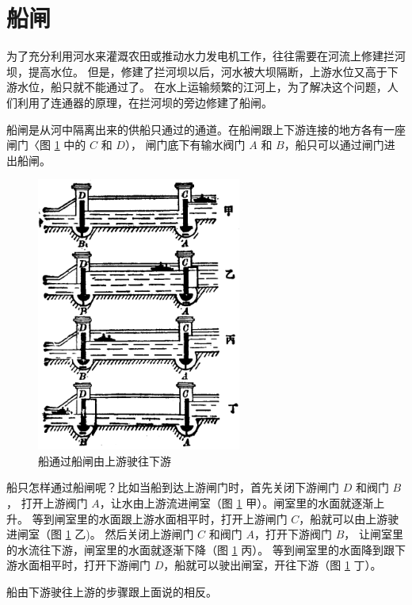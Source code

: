 \section{船闸}\label{sec:5-9}

为了充分利用河水来灌溉农田或推动水力发电机工作，往往需要在河流上修建拦河坝，提高水位。
但是，修建了拦河坝以后，河水被大坝隔断，上游水位又高于下游水位，船只就不能通过了。
在水上运输频繁的江河上，为了解决这个问题，人们利用了连通器的原理，在拦河坝的旁边修建了船闸。

船闸是从河中隔离出来的供船只通过的通道。在船闸跟上下游连接的地方各有一座闸门〈图 \ref{fig:5-34} 中的 $C$ 和 $D$），
闸门底下有输水阀门 $A$ 和 $B$，船只可以通过闸门进出船闸。

\begin{figure}[htbp]
    \centering
    \includegraphics[width=0.6\textwidth]{../pic/czwl1-ch5-34}
    \caption{船通过船闸由上游驶往下游}\label{fig:5-34}
\end{figure}

船只怎样通过船闸呢？比如当船到达上游闸门时，首先关闭下游闸门 $D$ 和阀门 $B$，
打开上游阀门 $A$，让水由上游流进闸室（图 \ref{fig:5-34} 甲）。闸室里的水面就逐渐上升。
等到闸室里的水面跟上游水面相平时，打开上游闸门 $C$，船就可以由上游驶进闸室（图 \ref{fig:5-34} 乙)。
然后关闭上游闸门 $C$ 和阀门 $A$，打开下游阀门 $B$， 让闸室里的水流往下游，闸室里的水面就逐渐下降（图 \ref{fig:5-34} 丙）。
等到闸室里的水面降到跟下游水面相平时，打开下游闸门 $D$，船就可以驶出闸室，开往下游（图 \ref{fig:5-34} 丁）。

船由下游驶往上游的步骤跟上面说的相反。

